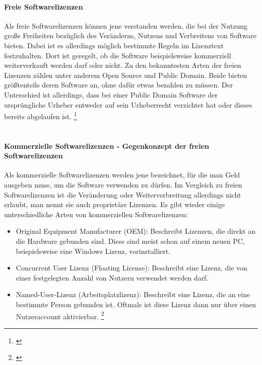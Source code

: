 \documentclass[titlepage,12pt,twoside]{article}
\begin{document}
\paragraph{Freie Softwarelizenzen}
\hfill \break
\hfill \break
Als freie Softwarelizenzen können jene verstanden werden, die bei der Nutzung große Freiheiten bezüglich des 
Veränderns, Nutzens und Verbreitens von Software bieten. Dabei ist es allerdings möglich bestimmte Regeln im 
Lizenztext festzuhalten. Dort ist geregelt, ob die Software beispielsweise kommerziell weiterverkauft werden 
darf oder nicht. Zu den bekanntesten Arten der freien Lizenzen zählen unter anderem Open Source und Public 
Domain. Beide bieten größtenteils deren Software an, ohne dafür etwas bezahlen zu müssen. Der Unterschied ist 
allerdings, dass bei einer Public Domain Software der ursprüngliche Urheber entweder auf sein Urheberrecht 
verzichtet hat oder dieses bereits abgelaufen ist. \footnote{\cite{Simpleclub24}} \\
\\
\paragraph{Kommerzielle Softwarelizenzen - Gegenkonzept der freien Softwarelizenzen}
\hfill \break
\hfill \break
Als kommerzielle Softwarelizenzen werden jene bezeichnet, für die man Geld ausgeben muss, um die Software 
verwenden zu dürfen. Im Vergleich zu freien Softwarelizenzen ist die  Veränderung oder Weiterverbreitung allerdings nicht erlaubt, man nennt sie auch 
proprietäre Lizenzen. Es gibt wieder einige unterschiedliche Arten von kommerziellen Softwarelizenzen: \\
\begin{itemize}
	\item Original Equipment Manufacturer (OEM): Beschreibt Lizenzen, die direkt an die Hardware gebunden 
	sind. Diese sind meist schon auf einem neuen PC, beispielsweise eine Windows Lizenz, vorinstalliert.
	\item Concurrent User Lizenz (Floating License): Beschreibt eine Lizenz, die von einer festgelegten 
	Anzahl von Nutzern verwendet werden darf.
	\item Named-User-Lizenz (Arbeitsplatzlizenz): Beschreibt eine Lizenz, die an eine bestimmte Person 
	gebunden ist. Oftmals ist diese Lizenz dann nur über einen Nutzeraccount aktivierbar. \footnote{\cite{Simpleclub25}}
\end{itemize}
\hfill \break
\end{document}
